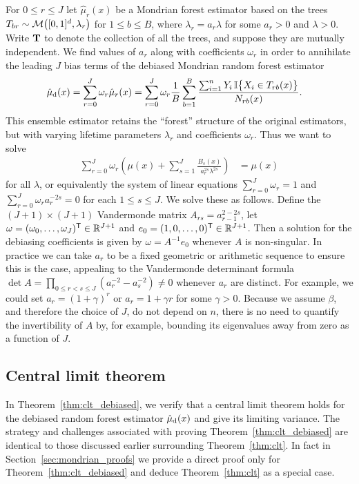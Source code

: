 For $0 \leq r \leq J$ let $\hat \mu_r(x)$ be a Mondrian forest estimator
based on the trees
$T_{b r} \sim \mathcal{M}\big([0,1]^d, \lambda_r \big)$
for $1 \leq b \leq B$, where $\lambda_r = a_r \lambda$ for some $a_r > 0$
and $\lambda > 0$.
Write $\mathbf{T}$ to denote the collection of all the trees,
and suppose they are mutually independent.
We find values of $a_r$
along with coefficients $\omega_r$ in order
to annihilate the leading $J$ bias terms of the
debiased Mondrian random forest estimator
%
\begin{align}
  \label{eq:debiased}
  \hat \mu_{\mathrm{d}}(x)
  &=
  \sum_{r=0}^J
  \omega_r \hat \mu_r(x)
  = \sum_{r=0}^{J}
  \omega_r
  \frac{1}{B}
  \sum_{b=1}^B
  \frac{\sum_{i=1}^n Y_i \,
  \mathbb{I}\big\{ X_i \in T_{r b}(x) \big\}}
  {N_{r b}(x)}.
\end{align}
%
This ensemble estimator retains the ``forest'' structure
of the original estimators,
but with varying lifetime parameters $\lambda_r$ and coefficients $\omega_r$.
Thus we want to solve
%
\begin{align*}
  \sum_{r=0}^{J}
  \omega_r
  \left(
    \mu(x)
    + \sum_{s=1}^{J}
    \frac{B_{s}(x)}{a_r^{2s} \lambda^{2s}}
  \right)
  &= \mu(x)
\end{align*}
%
for all $\lambda$, or equivalently the system of linear equations
$\sum_{r=0}^{J} \omega_r = 1$
and $\sum_{r=0}^{J} \omega_r a_r^{-2s} = 0$
for each $1 \leq s \leq J$.
We solve these as follows.
Define the $(J+1) \times (J+1)$ Vandermonde matrix
$A_{r s} = a_{r-1}^{2-2s}$,
let $\omega = (\omega_0, \ldots, \omega_J)^{\mathsf{T}} \in \mathbb{R}^{J+1}$
and $e_0 = (1, 0, \ldots, 0)^{\mathsf{T}} \in \mathbb{R}^{J+1}$.
Then a solution for the debiasing coefficients is given by
$\omega = A^{-1} e_0$ whenever $A$ is non-singular.
In practice we can take $a_r$ to be a fixed geometric or arithmetic sequence
to ensure this is the case,
appealing to the Vandermonde determinant formula
$\det A = \prod_{0 \leq r < s \leq J} (a_r^{-2} - a_s^{-2})
\neq 0$ whenever $a_r$ are distinct.
For example, we could set
$a_r = (1 + \gamma)^r$ or $a_r = 1 + \gamma r$ for some $\gamma > 0$.
Because we assume $\beta$, and therefore the choice of $J$, do not
depend on $n$, there is no need to quantify
the invertibility of $A$ by, for example, bounding its eigenvalues
away from zero as a function of $J$.

\subsection{Central limit theorem}

In Theorem~\ref{thm:clt_debiased}, we verify that a central
limit theorem holds for the debiased
random forest estimator $\hat\mu_{\mathrm{d}}(x)$ and give its limiting variance.
The strategy and challenges associated with proving
Theorem~\ref{thm:clt_debiased} are identical to those discussed earlier
surrounding Theorem~\ref{thm:clt}.
In fact in Section~\ref{sec:mondrian_proofs}
we provide a direct proof only for Theorem~\ref{thm:clt_debiased}
and deduce Theorem~\ref{thm:clt} as a special case.

